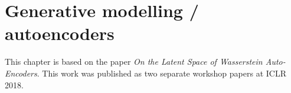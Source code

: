 \chapter{Generative modelling / autoencoders}

\ifpdf
    \graphicspath{{Chapter5/Figs/Raster/}{Chapter5/Figs/PDF/}{Chapter5/Figs/}}
\else
    \graphicspath{{Chapter5/Figs/Vector/}{Chapter5/Figs/}}
\fi

This chapter is based on the paper \emph{On the Latent Space of Wasserstein Auto-Encoders}. This work was published as two separate workshop papers at ICLR 2018.
